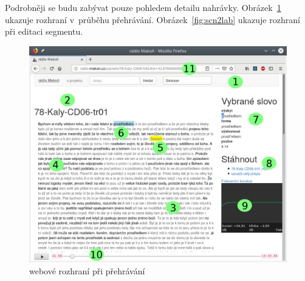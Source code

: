 Podrobněji se budu zabývat pouze pohledem detailu nahrávky.
Obrázek~\ref{fig:scn1lab} ukazuje rozhraní v~průběhu přehrávání.
Obrázek~\ref{fig:scn2lab} ukazuje rozhraní při editaci segmentu.

\begin{figure}[htpb]
\includegraphics[scale=0.7]{rc/radio-makon-cs-1-lab.png}
\caption{webové rozhraní při přehrávání}
\label{fig:scn1lab}
\end{figure}

